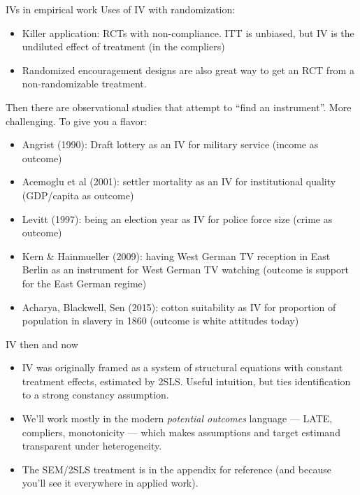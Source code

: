 \documentclass[xcolor=dvipsnames]{beamer}
\begin{document}
\begin{frame}{IVs in empirical work}
\small
{} Uses of IV with randomization:
\footnotesize
\begin{itemize}[<+->]
\item Killer application: RCTs with non-compliance.  ITT is unbiased, but IV is the undiluted effect of treatment (in the compliers)
\item Randomized encouragement designs are also great way to get an RCT from a non-randomizable treatment. 
\end{itemize}
\small
{} Then there are observational studies that attempt to ``find an instrument''. More challenging. To give you a flavor:\\
\footnotesize
\begin{itemize}[<+->]
\item
  Angrist (1990): Draft lottery as an IV for military service (income as
  outcome)
\item
  Acemoglu et al (2001): settler mortality as an IV for institutional
  quality (GDP/capita as outcome)
\item
  Levitt (1997): being an election year as IV for police force size
  (crime as outcome)
\item
  Kern \& Hainmueller (2009): having West German TV reception in East
  Berlin as an instrument for West German TV watching (outcome is
  support for the East German regime)
\item
  Acharya, Blackwell, Sen (2015): cotton suitability as IV for
  proportion of population in slavery in 1860 (outcome is white attitudes today)
\end{itemize}

\end{frame}

\begin{frame}{IV then and now}
\begin{itemize}
\item<2-> IV was originally framed as a system of structural equations with constant treatment effects, estimated by 2SLS. Useful intuition, but ties identification to a strong constancy assumption.
\medskip
\item<3-> We'll work mostly in the modern \emph{potential outcomes} language --- LATE, compliers, monotonicity --- which makes assumptions and target estimand transparent under heterogeneity.
\medskip
\item<4-> The SEM/2SLS treatment is in the appendix for reference (and because you'll see it everywhere in applied work).
\end{itemize}
\end{frame}
\end{document}
